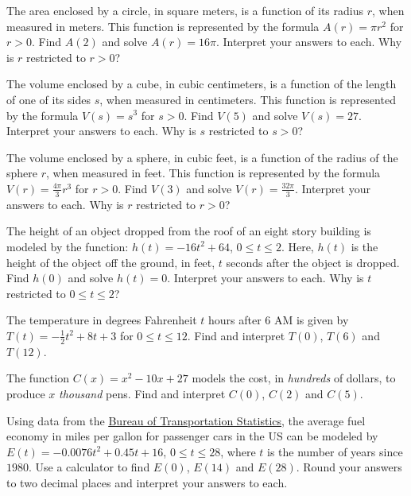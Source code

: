 \begin{exenum}
\item  The area enclosed by a circle, in square meters, is a function of its radius $r$, when measured in meters.  This function is represented by the formula $A(r) = \pi r^2$ for $r > 0$.  Find $A(2)$ and solve $A(r) = 16\pi$.  Interpret your answers to each.  Why is $r$ restricted to $r > 0$?

\item  The volume  enclosed by a cube, in cubic centimeters, is a function of the length of one of its sides $s$, when measured in centimeters.   This function is represented by the formula $V(s) = s^3$ for $s > 0$.  Find $V(5)$ and solve $V(s) = 27$.  Interpret your answers to each.  Why is $s$ restricted to $s > 0$?

\item  The volume enclosed by a sphere, in cubic feet, is a function of the radius of the sphere $r$, when measured in feet. This function is represented by the formula  $V(r) =\frac{4\pi}{3} r^{3}$ for $r > 0$.  Find $V(3)$ and solve $V(r) = \frac{32\pi}{3}$.  Interpret your answers to each.  Why is $r$ restricted to $r > 0$?

\item  The height of an object dropped from the roof of an eight story building is modeled by the function:  $h(t) = -16t^2 + 64$, $0 \leq t \leq 2$. Here,  $h(t)$ is the height of the object off the ground, in feet, $t$ seconds after the object is dropped.  Find $h(0)$ and solve $h(t) = 0$.  Interpret your answers to each.  Why is $t$ restricted to $0 \leq t \leq 2$?

\item  The temperature in degrees Fahrenheit $t$ hours after 6 AM is given by $T(t) = -\frac{1}{2} t^2 + 8t+3$ for $0 \leq t \leq 12$. Find and interpret $T(0)$, $T(6)$ and $T(12)$.  

\item The function $C(x) = x^2-10x+27$  models the cost, in \textit{hundreds} of dollars, to produce $x$ \textit{thousand} pens.  Find and interpret $C(0)$, $C(2)$ and $C(5)$.

\item Using data from the  \href{http://www.bts.gov/publications/national_transportation_statistics/html/table_04_23.html}{\underline{Bureau of Transportation Statistics}}, the average fuel economy in miles per gallon for passenger cars in the US can be modeled by  $E(t) = -0.0076t^2+0.45t + 16$, $0 \leq t \leq 28$, where $t$ is the number of years since $1980$. Use a calculator to find $E(0)$, $E(14)$ and $E(28)$.  Round your answers to two decimal places and interpret your answers to each.


\end{exenum}
